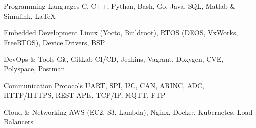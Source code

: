 
\begin{cvskills}

  \cvskill
    {Programming Languages} %
        {\large C, C++, Python, Bash, Go, Java, SQL, Matlab \& Simulink, LaTeX} %

  \cvskill
    {Embedded Development} %
	{\large Linux (Yocto, Buildroot), RTOS (DEOS, VxWorks, FreeRTOS), Device Drivers, BSP} %

  \cvskill
    {DevOps \& Tools} %
    {\large Git, GitLab CI/CD, Jenkins, Vagrant, Doxygen, CVE, Polyspace, Postman} %


  \cvskill
    {Communication Protocols} %
    {\large UART, SPI, I2C, CAN, ARINC, ADC, HTTP/HTTPS, REST APIs, TCP/IP, MQTT, FTP} %



  \cvskill
    {Cloud \& Networking} %
    {\large AWS (EC2, S3, Lambda), Nginx, Docker, Kubernetes, Load Balancers} %

\end{cvskills}

